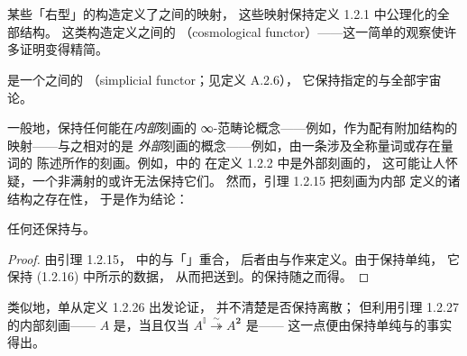 \providecommand{\Fun}{\operatorname{Fun}}
\providecommand{\QCat}{\mathcal{Q}\mathcal{C}at}
\providecommand{\CSS}{\mathcal{CSS}}
\providecommand{\Cat}{\mathcal{C}at}
\providecommand{\rvTfibArrow}{\mathrel{\stackrel{\sim}{\twoheadrightarrow}}}
\providecommand{\rvEqArrow}{\mathrel{\stackrel{\sim}{\Rightarrow}}} %
\section{\trCosmologicalFunctor}\label{sec:cosmological-functors}

某些「右\trAdjunction{}型」的构造定义了\trInfinityCosmos{}之间的映射，
这些映射保持定义 1.2.1 中公理化的全部结构。%
这类构造定义\trInfinityCosmos{}之间的\emph{\trCosmologicalFunctor}
（cosmological functor）——这一简单的观察使许多证明变得精简。

\begin{definition}[\trCosmologicalFunctor]\label{def:cosmological-functor}
\textbf{\trCosmologicalFunctor}是一个\trInfinityCosmos{}之间的
\textbf{\trSimplicialFunctor}（simplicial functor；见定义 A.2.6），%
它保持指定的\trIsofibration{}与全部宇宙论\trLimit{}。
\end{definition}

一般地，\trCosmologicalFunctor{}保持任何能在\trInfinityCosmos{}\emph{内部}刻画的
∞-范畴论概念——例如，作为配有附加结构的映射——与之相对的是
\emph{外部}刻画的概念——例如，由一条涉及全称量词或存在量词的
陈述所作的刻画。例如，\trInfinityCosmos{}中的\trEquivalence{}%
在定义 1.2.2 中是外部刻画的，%
这可能让人怀疑，一个非满射的\trCosmologicalFunctor{}或许无法保持它们。
然而，引理 1.2.15 把\trEquivalence{}刻画为\trInfinityCosmos{}内部
定义的诸结构之存在性，%
于是作为结论：

\begin{lemma}\label{lem:cosmological-preserves-equivalences}
任何\trCosmologicalFunctor{}还保持\trEquivalence{}与\trTrivialFibration{}。
\end{lemma}
\begin{proof}
由引理 1.2.15，%
\trInfinityCosmos{}中的\trEquivalence{}与「\trHomotopy\trEquivalence」重合，
后者由与\trFreeLivingIsomorphism{}作\trCotensor{}来定义。由于\trCosmologicalFunctor{}保持单纯\trCotensor{}，
它保持 (1.2.16) 中所示的数据，%
从而把\trEquivalence{}送到\trEquivalence{}。\trTrivialFibration{}的保持随之而得。
\end{proof}

\begin{remark}\label{rem:cosmological-discrete-categories}
类似地，单从定义 1.2.26 出发论证，%
并不清楚\trCosmologicalFunctor{}是否保持离散\trInfinityCategory{}；
但利用引理 1.2.27 的内部刻画——%
\trInfinityCategory{} $A$ 是\trDiscrete{}，当且仅当
$A^{\mathbb{I}}\rvTfibArrow A^{\mathbf{2}}$ 是\trTrivialFibration——
这一点便由\trCosmologicalFunctor{}保持单纯\trCotensor{}与\trTrivialFibration{}的事实得出。
\end{remark}

